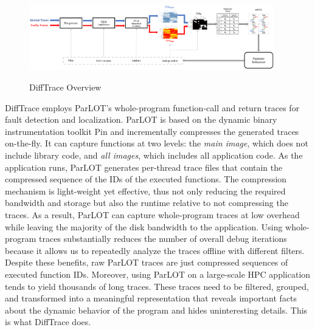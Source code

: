 \begin{figure}[]
\caption{DiffTrace Overview}
\includegraphics[width=0.95\textwidth]{figs/overview.png}
\label{fig.diffTraceOverview}
\end{figure}

DiffTrace employs ParLOT's \cite{parlot} whole-program function-call and return traces for fault detection and localization.
%
ParLOT is based on the dynamic binary instrumentation toolkit Pin \cite{pin} and incrementally compresses the generated traces on-the-fly.
%
It can capture functions at two levels: the \textit{main image}, which does not include library code, and \textit{all images}, which includes all application code.
%
As the application runs, ParLOT generates per-thread trace files that contain the compressed sequence of the IDs of the executed functions.
%
The compression mechanism is light-weight yet effective, thus not only reducing the required bandwidth and storage but also the runtime relative to not compressing the traces. As a result, ParLOT can capture whole-program traces at low overhead while leaving the majority of the disk bandwidth to the application. 
%
Using whole-program traces substantially reduces the number of overall debug iterations because it allows us to repeatedly analyze the traces offline with different filters.
%
Despite these benefits, raw ParLOT traces are just compressed sequences of executed function IDs.
%
Moreover, using ParLOT on a large-scale HPC application tends to yield thousands of long traces.
%
These traces need to be filtered, grouped, and transformed into a meaningful representation that reveals important facts about the dynamic behavior of the program and hides uninteresting details. This is what DiffTrace does.

